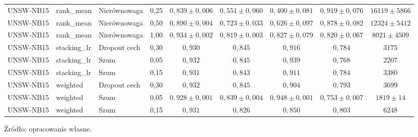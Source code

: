 \begin{table}[H]
{\begin{tabular}{llllccccc}
UNSW-NB15 & rank\_mean & Nierównowaga & 0{,}25 & $0{,}839 \pm 0{,}006$ & $0{,}551 \pm 0{,}060$ & $0{,}400 \pm 0{,}081$ & $0{,}919 \pm 0{,}076$ & $16119 \pm 5866$ \\
UNSW-NB15 & rank\_mean & Nierównowaga & 0{,}50 & $0{,}890 \pm 0{,}004$ & $0{,}723 \pm 0{,}033$ & $0{,}626 \pm 0{,}097$ & $0{,}878 \pm 0{,}082$ & $12324 \pm 5412$ \\
UNSW-NB15 & rank\_mean & Nierównowaga & 1{,}00 & $0{,}934 \pm 0{,}002$ & $0{,}819 \pm 0{,}003$ & $0{,}827 \pm 0{,}079$ & $0{,}820 \pm 0{,}067$ & $8021 \pm 4509$ \\
UNSW-NB15 & stacking\_lr & Dropout cech & 0{,}30 & $0{,}930$ & $0{,}845$ & $0{,}916$ & $0{,}784$ & $3175$ \\
UNSW-NB15 & stacking\_lr & Szum & 0{,}05 & $0{,}932$ & $0{,}845$ & $0{,}939$ & $0{,}768$ & $2207$ \\
UNSW-NB15 & stacking\_lr & Szum & 0{,}15 & $0{,}931$ & $0{,}843$ & $0{,}911$ & $0{,}784$ & $3380$ \\
UNSW-NB15 & weighted & Dropout cech & 0{,}30 & $0{,}932$ & $0{,}845$ & $0{,}904$ & $0{,}793$ & $3699$ \\
UNSW-NB15 & weighted & Szum & 0{,}05 & $0{,}928 \pm 0{,}001$ & $0{,}839 \pm 0{,}004$ & $0{,}948 \pm 0{,}001$ & $0{,}753 \pm 0{,}007$ & $1819 \pm 14$ \\
UNSW-NB15 & weighted & Szum & 0{,}15 & $0{,}931$ & $0{,}826$ & $0{,}850$ & $0{,}803$ & $6248$ \\
\hline
\end{tabular}}
\end{table}

Źródło: opracowanie własne.